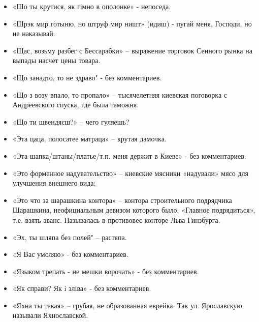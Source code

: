 \begin{itemize}
\item  «Шо ты крутися, як гімно в ополонке» - непоседа.
\item  «Шрэк мир готыню, но штруф мир ништ» (идиш) - пугай меня, Господи, но не наказывай.
\item  «Щас, возьму разбег с Бессарабки» – выражение торговок Сенного рынка на выпады насчет цены товара.
\item  «Що занадто, то не здраво" - без комментариев.
\item  «Що з возу впало, то пропало» – тысячелетняя киевская поговорка с Андреевского спуска, где была таможня.
\item  «Що ти швендяєш?» – чего гуляешь?
\item  «Эта цаца, полосатее матраца» – крутая дамочка.
\item  «Эта шапка/штаны/платье/т.п. меня держит в Киеве» - без комментариев.
\item  «Это форменное надувательство» – киевские мясники «надували» мясо для улучшения внешнего вида;
\item  «Это что за шарашкина контора» – контора строительного подрядчика Шарашкина, неофициальным девизом которого было: «Главное подрядиться», т.е. взять аванс. Называлась в противовес конторе Льва Гинзбурга.
\item  «Эх, ты шляпа без полей" – растяпа.
\item  «Я Вас умоляю» - без комментариев.
\item  «Языком трепать - не мешки ворочать» - без комментариев.
\item  «Як справи? Як i зліва» - без комментариев.
\item  «Яхна ты такая» – грубая, не образованная еврейка. Так ул. Ярославскую называли Яхнославской.
\end{itemize}
